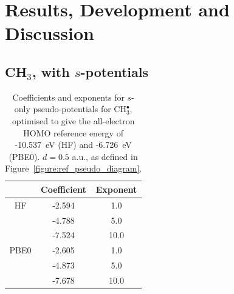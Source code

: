 \documentclass[journal=jctcce,manuscript=article]{achemso}
\begin{document}
\section{Results, Development and Discussion}
\subsection{CH\(_{3}\), with \(s\)-potentials}

\begin{table}[ht]
\caption{Coefficients and exponents for \(s\)-only pseudo-potentials for CH\(^{\bullet}_{3}\), optimised to give 
the all-electron HOMO reference energy of  -10.537~eV (HF) and -6.726~eV (PBE0). 
\(d = 0.5\) a.u., as defined in Figure~\ref{figure:ref_pseudo_diagram}.}
\begin{tabular}{c c c}
\hline
 & Coefficient & Exponent \\ 
\hline
HF & -2.594 & 1.0 \\
 & -4.788 & 5.0 \\
 & -7.524 & 10.0 \\
\hline
PBE0 & -2.605 & 1.0 \\
 & -4.873 & 5.0 \\
 & -7.678 & 10.0 \\
\hline
\end{tabular}
\label{table:ch3_s_potentials}
\end{table}
\end{document}
